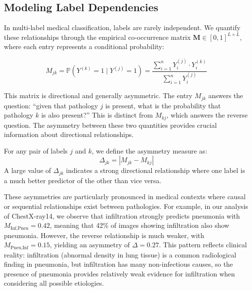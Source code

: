 \subsection{Modeling Label Dependencies}
\label{subsec:modeling-label-dependencies}

In multi-label medical classification, labels are rarely independent.
We quantify these relationships through the empirical co-occurrence matrix $\mathbf{M} \in [0,1]^{L \times L}$, where each entry represents a conditional probability:

\begin{equation}
M_{jk} = \mathbb{P}(Y^{(k)} = 1 \mid Y^{(j)} = 1) = \frac{\sum_{i=1}^{n} Y_i^{(j)} \cdot Y_i^{(k)}}{\sum_{i=1}^{n} Y_i^{(j)}}\label{eq:equation3}
\end{equation}

This matrix is directional and generally asymmetric.
The entry $M_{jk}$ answers the question: ``given that pathology $j$ is present, what is the probability that pathology $k$ is also present?'' This is distinct from $M_{kj}$, which answers the reverse question.
The asymmetry between these two quantities provides crucial information about directional relationships.

\begin{definition}
For any pair of labels $j$ and $k$, we define the asymmetry measure as:
\begin{equation}
\Delta_{jk} = |M_{jk} - M_{kj}|\label{eq:equation4}
\end{equation}
A large value of $\Delta_{jk}$ indicates a strong directional relationship where one label is a much better predictor of the other than vice versa.
\end{definition}

These asymmetries are particularly pronounced in medical contexts where causal or sequential relationships exist between pathologies.
For example, in our analysis of ChestX-ray14, we observe that infiltration strongly predicts pneumonia with $M_{\text{Inf},\text{Pneu}} = 0.42$, meaning that 42\% of images showing infiltration also show pneumonia.
However, the reverse relationship is much weaker, with $M_{\text{Pneu},\text{Inf}} = 0.15$, yielding an asymmetry of $\Delta = 0.27$.
This pattern reflects clinical reality: infiltration (abnormal density in lung tissue) is a common radiological finding in pneumonia, but infiltration has many non-infectious causes, so the presence of pneumonia provides relatively weak evidence for infiltration when considering all possible etiologies.
